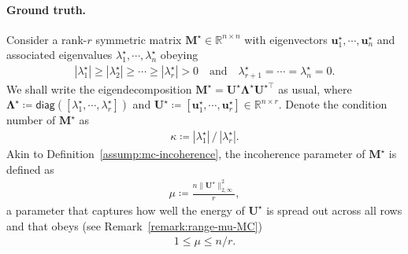 \paragraph{Ground truth.}
Consider a rank-$r$ symmetric matrix $\bm{M}^{\star}\in \mathbb{R}^{n\times n}$  with eigenvectors $\bm{u}_1^{\star},\cdots,\bm{u}_n^{\star}$ and associated eigenvalues $\lambda_1^{\star},\cdots,\lambda_n^{\star}$ obeying
%
\begin{align} \label{eq:assumption-lambda-r-positive-setup}
	|\lambda_1^{\star}| \geq |\lambda_2^{\star}| \geq \cdots \geq |\lambda_r^{\star}| >0
	\quad \text{and} \quad
	\lambda_{r+1}^{\star} = \cdots = \lambda_n^{\star}=0.
\end{align}
%
We shall write the eigendecomposition $\bm{M}^{\star}=\bm{U}^{\star}\bm{\Lambda}^{\star}\bm{U}^{\star\top}$ as usual, where $\bm{\Lambda}^{\star} \coloneqq \mathsf{diag}([\lambda_1^{\star},\cdots,\lambda_r^{\star}])$ and $\bm{U}^{\star}\coloneqq   [\bm{u}_1^{\star},\cdots, \bm{u}_r^{\star}]\in \mathbb{R}^{n\times r}$. Denote the condition number of $\bm{M}^{\star}$ as
%
\begin{align}
	\label{eq:defn-kappa}
	\kappa \coloneqq {|\lambda_1^{\star}|} \,/\, {|\lambda_r^{\star}|}.
\end{align}
%
Akin to Definition~\ref{assump:mc-incoherence}, the  incoherence parameter of $\bm{M}^{\star}$ is defined as
%
\begin{align}
	\mu \coloneqq \frac{n\|\bm{U}^{\star}\|_{2,\infty}^{2}}{r},
	\label{eq:defn-Ustar-incoherence}
\end{align}
%
a parameter that captures how well the energy of $\bm{U}^{\star}$ is spread out across all rows and that obeys (see Remark~\ref{remark:range-mu-MC})
%
\begin{align}
	1 \leq \mu \leq n/r .
	\label{eq:mu-constraint-general}
\end{align}



